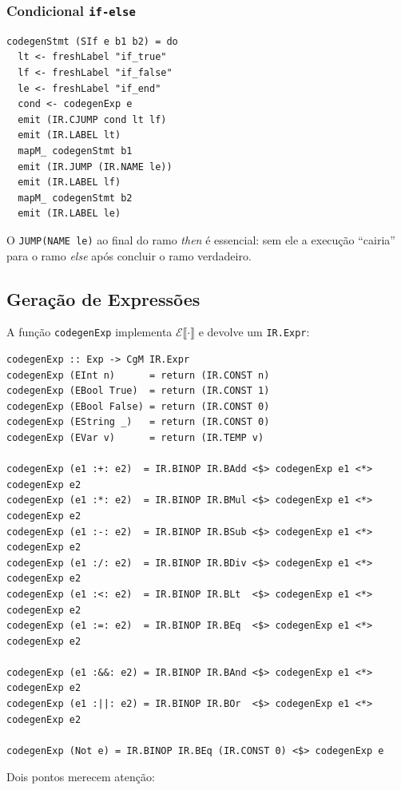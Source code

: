 \subsubsection*{Condicional \texttt{if-else}}

\begin{verbatim}
codegenStmt (SIf e b1 b2) = do
  lt <- freshLabel "if_true"
  lf <- freshLabel "if_false"
  le <- freshLabel "if_end"
  cond <- codegenExp e
  emit (IR.CJUMP cond lt lf)
  emit (IR.LABEL lt)
  mapM_ codegenStmt b1
  emit (IR.JUMP (IR.NAME le))
  emit (IR.LABEL lf)
  mapM_ codegenStmt b2
  emit (IR.LABEL le)
\end{verbatim}

O \texttt{JUMP(NAME le)} ao final do ramo \emph{then} é essencial: sem ele a
execução ``cairia'' para o ramo \emph{else} após concluir o ramo verdadeiro.

\subsection{Geração de Expressões}\label{sec:ir-impl-exprs}

A função \texttt{codegenExp} implementa $\mathcal{E}\llbracket \cdot
\rrbracket$ e devolve um \texttt{IR.Expr}:

\begin{verbatim}
codegenExp :: Exp -> CgM IR.Expr
codegenExp (EInt n)      = return (IR.CONST n)
codegenExp (EBool True)  = return (IR.CONST 1)
codegenExp (EBool False) = return (IR.CONST 0)
codegenExp (EString _)   = return (IR.CONST 0)
codegenExp (EVar v)      = return (IR.TEMP v)

codegenExp (e1 :+: e2)  = IR.BINOP IR.BAdd <$> codegenExp e1 <*> codegenExp e2
codegenExp (e1 :*: e2)  = IR.BINOP IR.BMul <$> codegenExp e1 <*> codegenExp e2
codegenExp (e1 :-: e2)  = IR.BINOP IR.BSub <$> codegenExp e1 <*> codegenExp e2
codegenExp (e1 :/: e2)  = IR.BINOP IR.BDiv <$> codegenExp e1 <*> codegenExp e2
codegenExp (e1 :<: e2)  = IR.BINOP IR.BLt  <$> codegenExp e1 <*> codegenExp e2
codegenExp (e1 :=: e2)  = IR.BINOP IR.BEq  <$> codegenExp e1 <*> codegenExp e2

codegenExp (e1 :&&: e2) = IR.BINOP IR.BAnd <$> codegenExp e1 <*> codegenExp e2
codegenExp (e1 :||: e2) = IR.BINOP IR.BOr  <$> codegenExp e1 <*> codegenExp e2

codegenExp (Not e) = IR.BINOP IR.BEq (IR.CONST 0) <$> codegenExp e
\end{verbatim}

Dois pontos merecem atenção:

